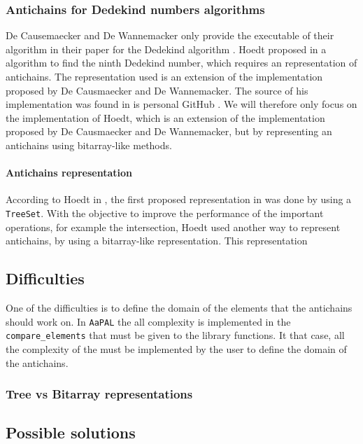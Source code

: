 \documentclass[letterpaper]{article}
\theoremstyle{definition}
\begin{document}
\subsubsection{Antichains for Dedekind numbers algorithms}

De Causemaecker and De Wannemacker only provide the executable of
their algorithm in their paper for
the Dedekind algorithm \cite{causemaecker1}. Hoedt proposed in \cite{hoedt}
a algorithm to find the ninth Dedekind number, which requires an representation
of antichains. The representation used is an extension of the implementation
proposed by De Causmaecker and De Wannemacker. The source of his
implementation was found in is personal GitHub \cite{hoedt_src}.
We will therefore only focus on the implementation
of Hoedt, which is an extension of the implementation proposed
by De Causmaecker and De Wannemacker, but by representing an antichains
using bitarray-like methods.

\paragraph{Antichains representation}

According to Hoedt in
\cite{hoedt}, the first proposed representation
in \cite{causemaecker1} was done by using
a \texttt{TreeSet}. With the objective to improve the performance of
the important operations, for example the intersection, Hoedt used
another way to represent antichains, by using a bitarray-like representation.
This representation

\subsection{Difficulties}


One of the difficulties is to define the domain of the elements that
the antichains should work on. In \texttt{AaPAL} the all complexity
is implemented in the \texttt{compare\_elements} that must be given
to the library functions. It that case, all the complexity of the
must be implemented by the user to define the domain of the antichains.

\subsubsection{Tree vs Bitarray representations}


\subsection{Possible solutions}
\end{document}
